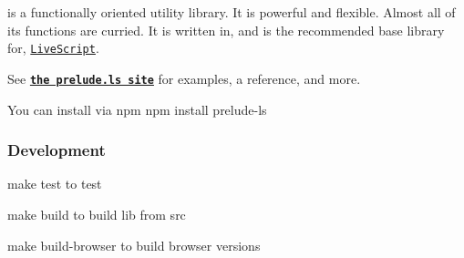 is a functionally oriented utility library. It is powerful and flexible. Almost all of its functions are curried. It is written in, and is the recommended base library for, \href{http://livescript.net}{\tt Live\+Script}.

See {\bfseries \href{http://preludels.com}{\tt the prelude.\+ls site}} for examples, a reference, and more.

You can install via npm {\ttfamily npm install prelude-\/ls}

\subsubsection*{Development}

{\ttfamily make test} to test

{\ttfamily make build} to build {\ttfamily lib} from {\ttfamily src}

{\ttfamily make build-\/browser} to build browser versions 
